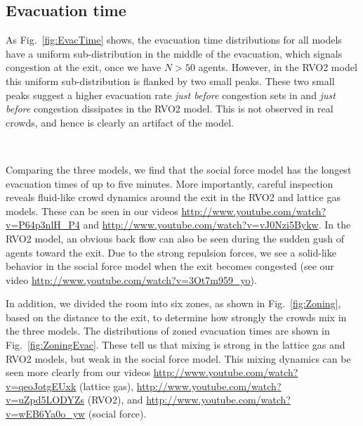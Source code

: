 \subsection{Evacuation time}
\label{EvacTime}

As Fig.~\ref{fig:EvacTime} shows, the evacuation time distributions for all models have a uniform sub-distribution in the middle of the evacuation, which signals congestion at the exit, once we have $N > 50$ agents. However, in the RVO2 model this uniform sub-distribution is flanked by two small peaks. These two small peaks suggest a higher evacuation rate \emph{just before} congestion sets in and \emph{just before} congestion dissipates in the RVO2 model. This is not observed in real crowds, and hence is clearly an artifact of the model.

\begin{figure*}[!tb]
\centering
{}
\hspace{1cm}
\\
\caption[Evacuation time distributions]{Evacuation time distributions for the (a) lattice gas, (b) social force, and (c) RVO2 models for $N = 50, 100, 150, 200, 300, 500, 1000$ agents. For each model and $N$, the distribution is built from 100 simulations.}
\label{fig:EvacTime}
\end{figure*}

Comparing the three models, we find that the social force model has the longest evacuation times of up to five minutes. More importantly, careful inspection reveals fluid-like crowd dynamics around the exit in the RVO2 and lattice gas models. These can be seen in our  videos \url{http://www.youtube.com/watch?v=P64p3nlH_P4} and  \url{http://www.youtube.com/watch?v=vJ0Nzi5Bykw}. In the RVO2 model, an obvious back flow can also be seen during the sudden gush of agents toward the exit. Due to the strong repulsion forces, we see a solid-like behavior in the social force model when the exit becomes congested (see our video \url{http://www.youtube.com/watch?v=3Ot7m959_yo}).

In addition, we divided the room into six zones, as shown in Fig.~\ref{fig:Zoning}, based on the distance to the exit, to determine how strongly the crowds mix in the three models. The distributions of zoned evacuation times are shown in Fig.~\ref{fig:ZoningEvac}. These tell us that mixing is strong in the lattice gas and RVO2 models, but weak in the social force model. This mixing dynamics can be seen more clearly from our videos \url{http://www.youtube.com/watch?v=qeoJotgEUxk} (lattice gas), \url{http://www.youtube.com/watch?v=uZpd5LODYZs} (RVO2), and \url{http://www.youtube.com/watch?v=wEB6Ya0o_yw} (social force).

